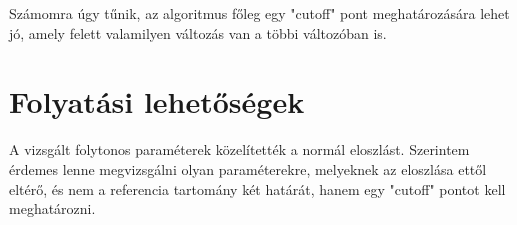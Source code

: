 Számomra úgy tűnik, az algoritmus főleg egy "cutoff" pont meghatározására lehet jó, amely felett valamilyen változás van a többi változóban is.

\section{Folyatási lehetőségek}
A vizsgált folytonos paraméterek közelítették a normál eloszlást. Szerintem érdemes lenne megvizsgálni olyan paraméterekre, melyeknek az eloszlása ettől eltérő, és nem a referencia tartomány két határát, hanem egy "cutoff" pontot kell meghatározni.